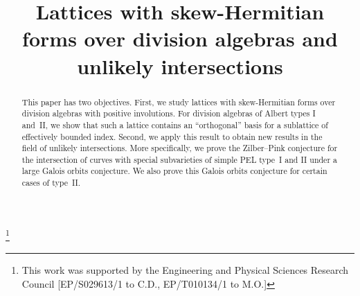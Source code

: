 \documentclass[JEP,XML,SOM,Unicode,NoFloatCountersInSection]{cedram}
\begin{document}
\frontmatter
\title[Lattices with skew-Hermitian forms and unlikely intersections]{Lattices with skew-Hermitian forms over division algebras and unlikely intersections}

\author[\initial{C.} \lastname{Daw}]{ }
\address{Department of Mathematics and Statistics, University of Reading\\
Whiteknights, PO Box 217, Reading, Berkshire RG6 6AH, United Kingdom}

\author[\initial{M.} \lastname{Orr}]{ }
\address{Department of Mathematics, The University of Manchester\\
Alan Turing Building, Oxford Road, Manchester M13 9PL, United Kingdom}

\thanks{This work was supported by the Engineering and Physical Sciences Research Council [EP/S029613/1 to C.D., EP/T010134/1 to M.O.]}



\begin{abstract}
This paper has two objectives. First, we study lattices with skew-Hermitian forms over division algebras with positive involutions. For division algebras of Albert types I and~II, we show that such a lattice contains an ``orthogonal'' basis for a sublattice of effectively bounded index. Second, we apply this result to obtain new results in the field of unlikely intersections. More specifically, we prove the Zilber--Pink conjecture for the intersection of curves with special subvarieties of simple PEL type~I and II under a large Galois orbits conjecture. We also prove this Galois orbits conjecture for certain cases of type~II.
\end{abstract}


\end{document}
